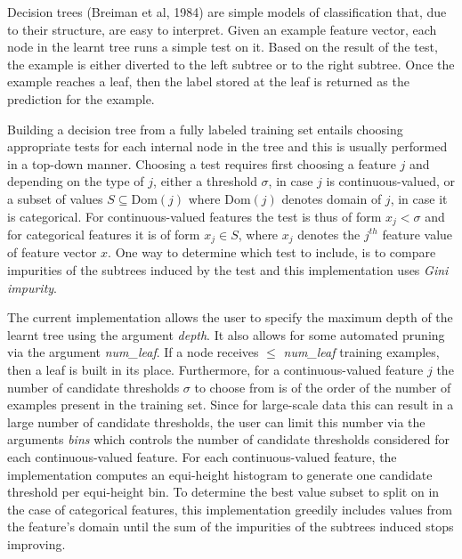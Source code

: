 Decision trees (Breiman et al, 1984) are simple models of
classification that,  due to their structure,  are easy to
interpret. Given an example feature vector, each node in the learnt
tree runs a simple test on it. Based on the result of the test, the
example is either diverted to the left subtree or to the right
subtree. Once the example reaches a leaf, then the label stored at the
leaf is returned as the prediction for the example.

\par

Building a decision tree from a fully labeled training set entails
choosing appropriate tests for each internal node in the tree and this
is usually performed in a top-down manner. Choosing a test requires
first choosing a feature $j$ and depending on the type of $j$, either
a threshold $\sigma$, in case $j$ is continuous-valued, or a subset of
values $S \subseteq \text{Dom}(j)$ where $\text{Dom}(j)$ denotes
domain of $j$, in case it is categorical. For continuous-valued
features the test is thus of form $x_j < \sigma$ and for categorical
features it is of form $x_j \in S$, where $x_j$ denotes the $j^{th}$
feature value of feature vector $x$. One way to determine which test
to include, is to compare impurities of the subtrees induced by the
test and this implementation uses {\it Gini impurity}.

\par

The current implementation allows the user to specify the maximum
depth of the learnt tree using the argument {\it depth}. It also
allows for some automated pruning via the argument {\it num\_leaf}. If
a node receives $\leq$ {\it num\_leaf} training examples, then a leaf
is built in its place. Furthermore, for a continuous-valued feature
$j$ the number of candidate thresholds $\sigma$ to choose from is of
the order of the number of examples present in the training set. Since
for large-scale data this can result in a large number of candidate
thresholds, the user can limit this number via the arguments {\it
  bins} which controls the number of candidate thresholds considered
for each continuous-valued feature. For each continuous-valued
feature, the implementation computes an equi-height histogram to
generate one candidate threshold per equi-height bin. To determine the
best value subset to split on in the case of categorical features,
this implementation greedily includes values from the feature's domain
until the sum of the impurities of the subtrees induced stops
improving.

